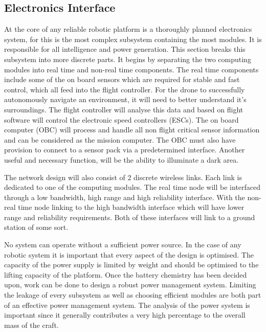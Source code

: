		\subsection{Electronics Interface}
		At the core of any reliable robotic platform is a thoroughly planned electronics system, for \projectName this is the most complex subsystem containing the most modules. It is responsible for all intelligence and power generation. This section breaks this subsystem into more discrete parts. It begins by separating the two computing modules into real time and non-real time components. The real time components include some of the on board sensors which are required for stable and fast control, which all feed into the flight controller. For the drone to successfully autonomously navigate an environment, it will need to better understand it's surroundings. The flight controller will analyse this data and based on flight software will control the electronic speed controllers (ESCs). The on board computer (OBC) will process and handle all non flight critical sensor information and can be considered as the mission computer. The OBC must also have provision to connect to a sensor pack via a predetermined interface. Another useful and necessary function, will be the ability to illuminate a dark area. 
		
		The network design will also consist of 2 discrete wireless links. Each link is dedicated to one of the computing modules. The real time node will be interfaced through a low bandwidth, high range and high reliability interface. With the non-real time node linking to the high bandwidth interface which will have lower range and reliability requirements. Both of these interfaces will link to a ground station of some sort.
		
		No system can operate without a sufficient power source. In the case of any robotic system it is important that every aspect of the design is optimised. The capacity of the power supply is limited by weight and should be optimised to the lifting capacity of the platform. Once the battery chemistry has been decided upon, work can be done to design a robust power management system. Limiting the leakage of every subsystem as well as choosing efficient modules are both part of an effective power management system. The analysis of the power system is important since it generally contributes a very high percentage to the overall mass of the craft.
		
